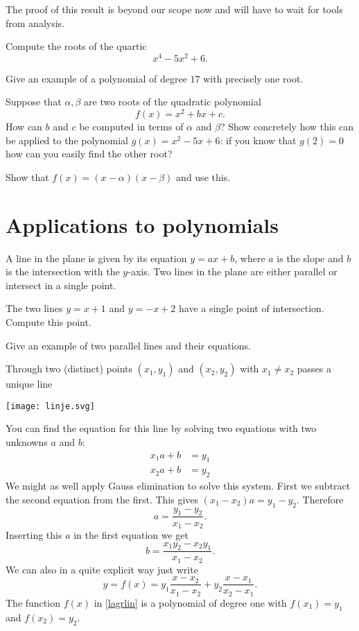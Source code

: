 \documentclass{article}
\begin{document}
The proof of this result is beyond our scope now and will have to wait for tools from analysis.

\beginshex
Compute the roots of the quartic
$$
x^4 - 5x^2 + 6.
$$
\endshex

\beginshex
Give an example of a polynomial of degree $17$ with precisely one root.
\endshex

\beginshex
Suppose that $\alpha, \beta$ are two roots of the quadratic polynomial
$$
f(x) = x^2 + b x + c.
$$
How can $b$ and $c$ be computed in terms of $\alpha$ and $\beta$?
Show concretely how this can be applied to the polynomial
$g(x) = x^2 - 5 x + 6$: if you know that $g(2) = 0$ how can you easily
find the other root?

\begin{hint}
Show that $f(x) = (x-\alpha)(x-\beta)$ and use this.  
\end{hint}
\endshex



\section{Applications to polynomials}


A line in the plane is given by its equation $y = a x + b$, where $a$ is the slope 
and $b$ is the intersection with the $y$-axis. Two lines in the plane
are either parallel or intersect in a single point.

\beginshex
The two lines $y = x+1$ and $y=-x+2$ have a single point
of intersection. Compute this point.

Give an example of two parallel lines and their equations.
\endshex

Through two (distinct) points $(x_1, y_1)$ and $(x_2, y_2)$ with $x_1\neq x_2$ passes a unique line 

\texttt{[image: linje.svg]}

You can find the equation for this line by solving
two equations with two unknowns $a$ and $b$:
\begin{align*}
x_1 a + b &= y_1\\
x_2 a + b &= y_2
\end{align*}
We might as well apply Gauss elimination to solve this system. First we
subtract the second equation from the first. This gives
$(x_1 - x_2) a = y_1 - y_2$. Therefore
$$
a = \frac{y_1 - y_2}{x_1 - x_2}.
$$
Inserting this $a$ in the first equation we get
$$
b = \frac{x_1 y_2 -x_2 y_1}{x_1 - x_2}.
$$
We can also in a quite explicit way just write
\begin{equation}\label{lagrlin}
y = f(x) = y_1 \frac{x - x_2}{x_1 - x_2} + y_2 \frac{x - x_1}{x_2 - x_1}.
\end{equation}
The function $f(x)$ in 
\eqref{lagrlin} is a polynomial of degree one with
$f(x_1) = y_1$ and $f(x_2) = y_2$.
\end{document}
